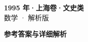 \documentclass[zihao=-4, a4paper]{ctexart}
\begin{document}
\begin{center}
  {\Large\bfseries 1995 年·上海卷·文史类}\\[4pt]
  {\large 数学 · 解析版}
\end{center}
\medskip
{}

\clearpage
{}
\begin{center}{\Large\bfseries 参考答案与详细解析}\end{center}
\medskip

\end{document}
